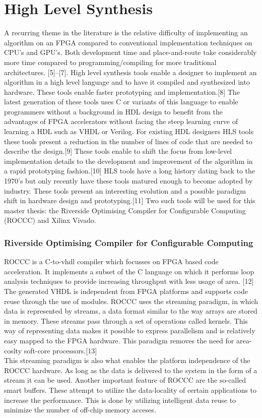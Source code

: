 

\chapter{High Level Synthesis}

A recurring theme in the literature is the relative difficulty of implementing an algorithm on an FPGA compared to conventional implementation techniques on CPU's and GPU's. Both development time and place-and-route take considerably more time compared to programming/compiling for more traditional architectures.  [5]--[7].
High level synthesis tools enable a designer to implement an algorithm in a high level language and to have it compiled and synthesized into hardware. These tools enable faster prototyping and implementation.[8] The latest generation of these tools uses C or variants of this language to enable programmers without a background in HDL design to benefit from the advantages of FPGA accelerators without facing the steep learning curve of learning a HDL such as VHDL or Verilog. For existing HDL designers HLS tools these tools present a reduction in the number of lines of code that are needed to describe the design.[9]  These tools enable to shift the focus from low-level implementation details to the development and improvement of the algorithm in a rapid prototyping fashion.[10]
HLS tools have a long history dating back to the 1970's but only recently have these tools matured enough to become adopted by industry. These tools present an interesting evolution and a possible paradigm shift in hardware design and prototyping.[11]
 Two such tools will be used for this master thesis: the Riverside Optimising Compiler for Configurable Computing (ROCCC) and Xilinx Vivado.

\subsection{Riverside Optimising Compiler for Configurable Computing} 
ROCCC is a C-to-vhdl compiler which focusses on FPGA based code acceleration. It implements a subset of the C language on which it performs loop analysis techniques to provide increasing throughput with less usage of area. [12] The generated VHDL is independent from FPGA platforms and supports code reuse through the use of modules. 
ROCCC uses the streaming paradigm, in which data is represented by streams, a data format similar to the way arrays are stored in memory. These streams pass through a set of operations called kernels. This way of representing data makes it possible to express parallelism and is relatively easy mapped to the FPGA hardware. This paradigm removes the need for area-coslty soft-core processors.[13]\\
This streaming paradigm is also what enables the platform independence of the ROCCC hardware. As long as the data is delivered to the system in the form of a stream it can be used.
Another important feature of ROCCC are the so-called smart buffers. These attempt to utilize the data-locality of certain applications to increase the performance. This is done by utilizing intelligent data reuse to minimize the number of off-chip memory acceses. 

